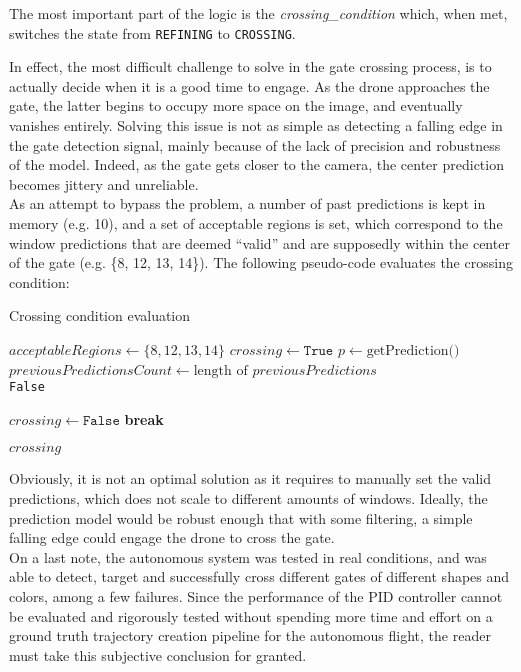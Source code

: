 The most important part of the logic is the \emph{crossing\_condition} which,
when met, switches the state from \texttt{REFINING} to \texttt{CROSSING}.

In effect, the most difficult challenge to solve in the gate crossing process,
is to actually decide when it is a good time to engage. As the drone
approaches the gate, the latter begins to occupy more space on the image, and
eventually vanishes entirely. Solving this issue is not as simple as detecting
a falling edge in the gate detection signal, mainly because of the lack of
precision and robustness of the model. Indeed, as the gate gets closer to the
camera, the center prediction becomes jittery and unreliable.\\

As an attempt to bypass the problem, a number of past predictions is kept in
memory (e.g. 10), and a set of acceptable regions is set, which correspond to
the window predictions that are deemed ``valid'' and are supposedly within the
center of the gate (e.g. \{8, 12, 13, 14\}). The following pseudo-code evaluates
the crossing condition:

\makeatletter
\def\BState{\State\hskip-\ALG@thistlm}
\makeatother

\begin{algorithm}
	\caption{Crossing condition evaluation}\label{alg:crosscond}
	\begin{algorithmic}[1]
			\State $\textit{acceptableRegions} \gets \{8, 12, 13, 14\}$
			\State $crossing \gets \texttt{True}$
			\State $p \gets \text{getPrediction()}$
			\State $previousPredictionsCount \gets \text{length of }
				\textit{previousPredictions}$
			~\\
				\Return \texttt{False}
			\EndIf

					\State $crossing \gets \texttt{False}$
					\State \textbf{break}
				\EndIf
			\EndFor

			\Return $\textit{crossing}$
		\EndProcedure
	\end{algorithmic}
\end{algorithm}

Obviously, it is not an optimal solution as it requires to manually set the
valid predictions, which does not scale to different amounts of windows.
Ideally, the prediction model would be robust enough that with some filtering,
a simple falling edge could engage the drone to cross the gate.\\

On a last note, the autonomous system was tested in real conditions, and was
able to detect, target and successfully cross different gates of different
shapes and colors, among a few failures. Since the performance of the PID
controller cannot be evaluated and rigorously tested without spending more time
and effort on a ground truth trajectory creation pipeline for the autonomous
flight, the reader must take this subjective conclusion for granted.
